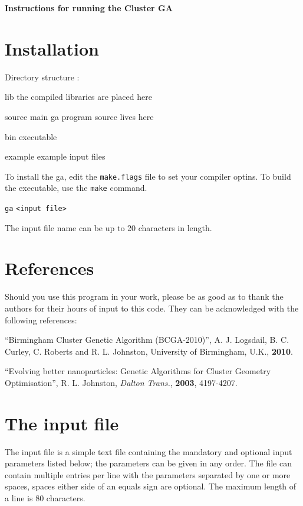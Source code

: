 \documentclass[12pt,a4paper]{article}
\newenvironment{entry}[1]
{\begin{list}{}{\renewcommand{\makelabel}[1]{~~\texttt{##1 :}\hfil}
      \setlength{\labelwidth}{90pt}
      \setlength{\leftmargin}{\labelwidth+\labelsep}}}
{\end{list}}
\begin{document}
\begin{center}
\LARGE\textbf{Instructions for running the Cluster GA}
\end{center}

\section{Installation}

Directory structure :
\begin{entry}{a}
\item[lib] the compiled libraries are placed here
\item[source] main ga program source lives here
\item[bin] executable
\item[example] example input files
\end{entry}
To install the ga, edit the \texttt{make.flags} file to set your compiler
optins. To build the executable, use the \texttt{make} command.
\begin{center}
\texttt{ga} \texttt{<input file>}
\end{center}
The input file name can be up to 20 characters in length.

\pagebreak

\section{References}
Should you use this program in your work, please be as good as to thank the authors for their hours of input to this code. They can be acknowledged with the following references:

\begin{center}
``Birmingham Cluster Genetic Algorithm (BCGA-2010)'', A. J. Logsdail, B. C. Curley, C. Roberts and R. L. Johnston, University of Birmingham, U.K., \textbf{2010}.
\end{center}

\begin{center}
``Evolving better nanoparticles: Genetic Algorithms for Cluster Geometry Optimisation'', R. L. Johnston, \textit{Dalton Trans.}, \textbf{2003}, 4197-4207.
\end{center}

\pagebreak

\section{The input file}

The input file is a simple text file containing the mandatory and optional input parameters listed below; the parameters can be given in any order. The file can contain multiple entries per line with the parameters separated by one or more spaces, spaces either side of an equals sign are optional. The maximum length of a line is 80 characters.
\end{document}
